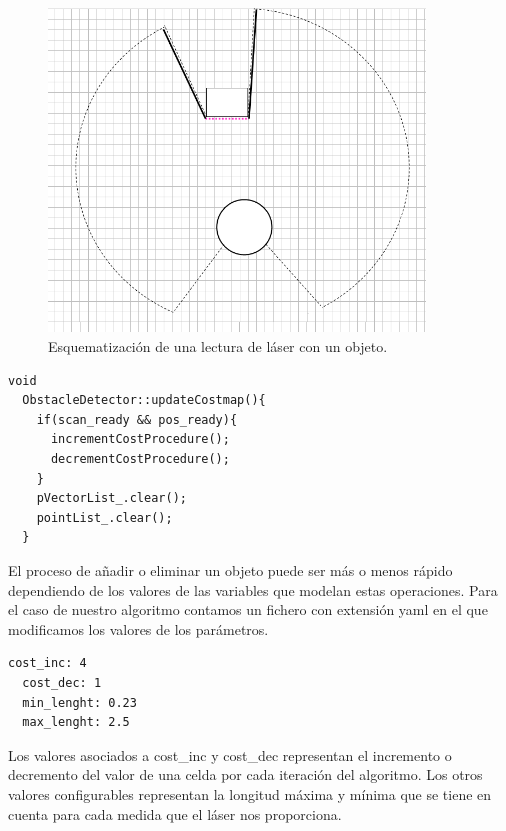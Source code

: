 \begin{figure} [H]
  \begin{center}
    \includegraphics[width=10cm]{img/cap5/lecturaLaser}
  \end{center}
  \caption{Esquematización de una lectura de láser con un objeto.}
  \label{fig:lecturalaser}
\end{figure}


\renewcommand{\lstlistingname}{Código}
\begin{lstlisting}[caption=Función que actualiza el mapa en cada iteración, label={lst:updatecostmap}]
  void
  ObstacleDetector::updateCostmap(){
    if(scan_ready && pos_ready){
      incrementCostProcedure();
      decrementCostProcedure();
    }
    pVectorList_.clear();
    pointList_.clear();
  }
\end{lstlisting}

El proceso de añadir o eliminar un objeto puede ser más o menos rápido dependiendo de los valores de las variables que modelan estas operaciones. Para el caso de nuestro algoritmo contamos un fichero con extensión yaml en el que modificamos los valores de los parámetros.

\renewcommand{\lstlistingname}{Código}
\begin{lstlisting}[caption=Fichero de configuración obstacle\_detector.yaml, label={lst:obstacledetectorconfig}]
  cost_inc: 4
  cost_dec: 1
  min_lenght: 0.23
  max_lenght: 2.5
\end{lstlisting}

Los valores asociados a cost\_inc y cost\_dec representan el incremento o decremento del valor de una celda por cada iteración del algoritmo. Los otros valores configurables representan la longitud máxima y mínima que se tiene en cuenta para cada medida que el láser nos proporciona.

